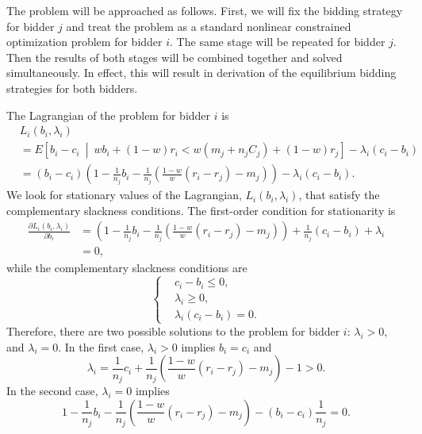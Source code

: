 The problem will be approached as follows. First, we will fix the bidding strategy for bidder $j$ and treat the problem as a standard nonlinear constrained optimization problem for bidder $i$. The same stage will be repeated for bidder $j$. Then the results of both stages will be combined together and solved simultaneously. In effect, this will result in derivation of the equilibrium bidding strategies for both bidders.

The Lagrangian of the problem for bidder $i$ is
\begin{align}
	&L_i(b_i,\lambda_i) \nonumber\\
	&= E \left[ b_i-c_i \:\middle\vert\: wb_i + (1-w)r_i < w(m_j + n_j C_j) + (1-w)r_j\right] - \lambda_i(c_i-b_i) \nonumber\\
	&= (b_i-c_i)\left(1-\frac{1}{n_j}b_i - \frac{1}{n_j}\left(\frac{1-w}{w}(r_i-r_j)-m_j\right)\right) - \lambda_i(c_i-b_i).
	\label{eq:pcomp_langrangean_bidder_i}
\end{align}
We look for stationary values of the Lagrangian, $L_i(b_i,\lambda_i)$, that satisfy the complementary slackness conditions. The first-order condition for stationarity is
\begin{align*}
	\frac{\partial L_i(b_i,\lambda_i)}{\partial b_i} &= \left( 1 - \frac{1}{n_j}b_i - \frac{1}{n_j}\left( \frac{1-w}{w}(r_i-r_j)-m_j \right) \right) + \frac{1}{n_j}\left(c_i-b_i\right) + \lambda_i\nonumber\\
	&=0,
\end{align*}
while the complementary slackness conditions are
\begin{equation*}
	\left\{
	\begin{array}{ll}
		&c_i-b_i\le 0,\\
		&\lambda_i\ge 0,\\
		&\lambda_i(c_i-b_i) = 0.
	\end{array}
	\right.
\end{equation*}
Therefore, there are two possible solutions to the problem for bidder $i$: $\lambda_i > 0$, and $\lambda_i=0$. In the first case, $\lambda_i > 0$ implies $b_i = c_i$ and
\begin{equation*}
	\lambda_i = \frac{1}{n_j}c_i + \frac{1}{n_j}\left( \frac{1-w}{w}(r_i-r_j) - m_j \right) - 1 > 0.
\end{equation*}
In the second case, $\lambda_i = 0$ implies
\begin{equation*}
	1 - \frac{1}{n_j}b_i - \frac{1}{n_j}\left( \frac{1-w}{w}(r_i-r_j) - m_j \right) - (b_i-c_i)\frac{1}{n_j} = 0.
\end{equation*}

